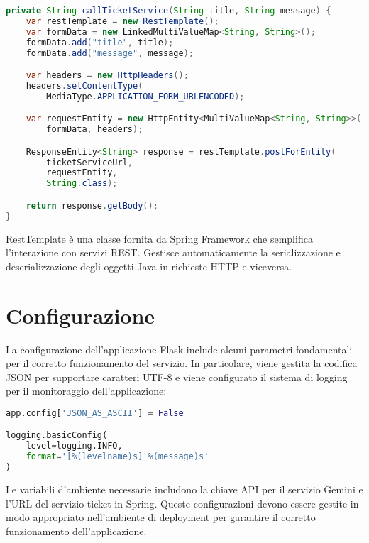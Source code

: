 \begin{lstlisting}[language=Java, caption=Codice Integrazione Spring]
private String callTicketService(String title, String message) {
    var restTemplate = new RestTemplate();
    var formData = new LinkedMultiValueMap<String, String>();
    formData.add("title", title);
    formData.add("message", message);

    var headers = new HttpHeaders();
    headers.setContentType(
        MediaType.APPLICATION_FORM_URLENCODED);

    var requestEntity = new HttpEntity<MultiValueMap<String, String>>(
        formData, headers);

    ResponseEntity<String> response = restTemplate.postForEntity(
        ticketServiceUrl,
        requestEntity,
        String.class);

    return response.getBody();
}
\end{lstlisting}

\begin{definition}[RestTemplate]
RestTemplate è una classe fornita da Spring Framework che semplifica l'interazione con servizi REST. Gestisce automaticamente la serializzazione e deserializzazione degli oggetti Java in richieste HTTP e viceversa.
\end{definition}

\section{Configurazione}
La configurazione dell'applicazione Flask include alcuni parametri fondamentali per il corretto funzionamento del servizio. In particolare, viene gestita la codifica JSON per supportare caratteri UTF-8 e viene configurato il sistema di logging per il monitoraggio dell'applicazione:

\begin{lstlisting}[language=Python, caption=Configurazione base]
app.config['JSON_AS_ASCII'] = False

logging.basicConfig(
    level=logging.INFO,
    format='[%(levelname)s] %(message)s'
)
\end{lstlisting}

Le variabili d'ambiente necessarie includono la chiave API per il servizio Gemini e l'URL del servizio ticket in Spring. Queste configurazioni devono essere gestite in modo appropriato nell'ambiente di deployment per garantire il corretto funzionamento dell'applicazione.
